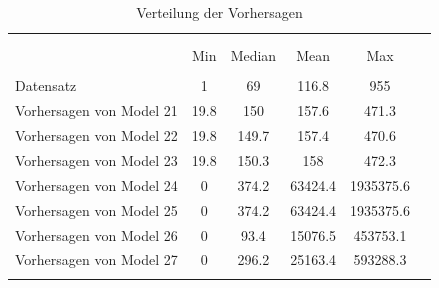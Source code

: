 \documentclass[a4paper,12pt]{thesis}
\begin{document}
\begin{table}[!htbp] \centering 
	\caption{Verteilung der Vorhersagen} 
	\label{ForecastDistribution} 
	\begin{tabular}{@{\extracolsep{-5pt}}lccccc} 
		\\[-1.8ex]\hline 
		\hline \\[-1.8ex] 
		\\[-1.8ex] & Min & Median & Mean & Max\\ 
		\hline \\[-1.8ex] 
		Datensatz & 1 & 69 & 116.8 & 955 \\ 
		Vorhersagen von Model 21	 & 19.8 & 150 & 157.6 & 471.3 \\ 
		Vorhersagen von Model 22	 & 19.8 & 149.7 & 157.4 & 470.6 \\ 
		Vorhersagen von Model 23	 & 19.8 & 150.3 & 158 & 472.3 \\ 
		Vorhersagen von Model 24	 & 0 & 374.2 & 63424.4 & 1935375.6\\ 
		Vorhersagen von Model 25	 & 0 & 374.2 & 63424.4 & 1935375.6\\ 
		Vorhersagen von Model 26	 & 0 & 93.4 & 15076.5 & 453753.1\\ 
		Vorhersagen von Model 27	 & 0 & 296.2 & 25163.4 & 593288.3\\ 
		\hline \\[-1.8ex] 
	\end{tabular} 
\end{table} 
\end{document}
